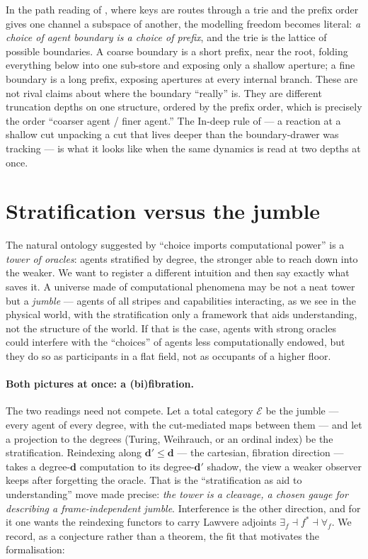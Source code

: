 \documentclass[11pt]{article}
\theoremstyle{definition}
\theoremstyle{plain}
\theoremstyle{remark}
\newcommand{\dgr}{\mathbf{d}}
\begin{document}
In the path reading of \cite{paths}, where keys are routes through a trie and the
prefix order gives one channel a subspace of another, the modelling freedom
becomes literal: \emph{a choice of agent boundary is a choice of prefix}, and the
trie is the lattice of possible boundaries. A coarse boundary is a short prefix,
near the root, folding everything below into one sub-store and exposing only a
shallow aperture; a fine boundary is a long prefix, exposing apertures at every
internal branch. These are not rival claims about where the boundary ``really''
is. They are different truncation depths on one structure, ordered by the prefix
order, which is precisely the order ``coarser agent / finer agent.'' The In-deep
rule of \cite{paths} --- a reaction at a shallow cut unpacking a cut that lives
deeper than the boundary-drawer was tracking --- is what it looks like when the
same dynamics is read at two depths at once.

\section{Stratification versus the jumble}\label{sec:jumble}

The natural ontology suggested by ``choice imports computational power'' is a
\emph{tower of oracles}: agents stratified by degree, the stronger able to reach
down into the weaker. We want to register a different intuition and then say
exactly what saves it. A universe made of computational phenomena may be not a
neat tower but a \emph{jumble} --- agents of all stripes and capabilities
interacting, as we see in the physical world, with the stratification only a
framework that aids understanding, not the structure of the world. If that is the
case, agents with strong oracles could interfere with the ``choices'' of agents
less computationally endowed, but they do so as participants in a flat field, not
as occupants of a higher floor.

\paragraph{Both pictures at once: a (bi)fibration.}
The two readings need not compete. Let a total category $\mathcal{E}$ be the
jumble --- every agent of every degree, with the cut-mediated maps between them ---
and let a projection to the degrees (Turing, Weihrauch, or an ordinal index) be
the stratification. Reindexing along $\dgr' \le \dgr$ --- the cartesian, fibration
direction --- takes a degree-$\dgr$ computation to its degree-$\dgr'$ shadow, the
view a weaker observer keeps after forgetting the oracle. That is the
``stratification as aid to understanding'' move made precise: \emph{the tower is a
cleavage, a chosen gauge for describing a frame-independent jumble}. Interference
is the other direction, and for it one wants the reindexing functors to carry
Lawvere adjoints $\exists_f \dashv f^{*} \dashv \forall_f$. We record, as a
conjecture rather than a theorem, the fit that motivates the formalisation:
\end{document}
